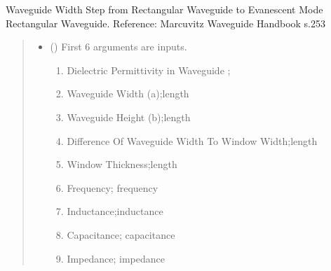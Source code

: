 \documentclass[letterpaper,10pt,english]{sphinxmanual}
\begin{document}

\begin{fulllineitems}
\label{\detokenize{components:components.InductiveWindowInWaveguide}}
\pysigstartsignatures
{}
\pysigstopsignatures
\sphinxAtStartPar
Waveguide Width Step from Rectangular Waveguide to Evanescent Mode Rectangular Waveguide.
Reference:  Marcuvitz Waveguide Handbook s.253
\begin{quote}\begin{description}
\begin{itemize}
\item {} 
\sphinxAtStartPar
{} () \textendash{} 
\sphinxAtStartPar
First 6 arguments are inputs.
\begin{enumerate}
%
\item {} 
\sphinxAtStartPar
Dielectric Permittivity in Waveguide ;

\item {} 
\sphinxAtStartPar
Waveguide Width (a);length

\item {} 
\sphinxAtStartPar
Waveguide Height (b);length

\item {} 
\sphinxAtStartPar
Difference Of Waveguide Width To Window Width;length

\item {} 
\sphinxAtStartPar
Window Thickness;length

\item {} 
\sphinxAtStartPar
Frequency; frequency

\item {} 
\sphinxAtStartPar
Inductance;inductance

\item {} 
\sphinxAtStartPar
Capacitance; capacitance

\item {} 
\sphinxAtStartPar
Impedance; impedance

\end{enumerate}



\end{itemize}
\end{description}
\end{quote}
\end{fulllineitems}
\end{document}
